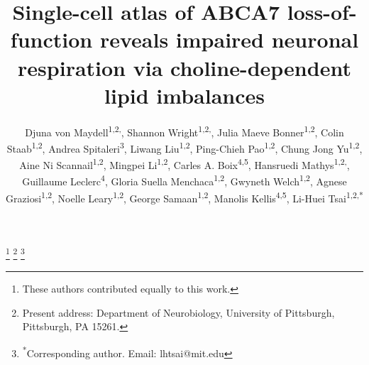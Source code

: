 \title{Single-cell atlas of ABCA7 loss-of-function reveals impaired neuronal respiration via choline-dependent lipid imbalances}

\author{%
  \parbox{\textwidth}{%
    Djuna von Maydell\textsuperscript{1,2,\textdagger}, 
    Shannon Wright\textsuperscript{1,2,\textdagger}, 
    Julia Maeve Bonner\textsuperscript{1,2}, 
    Colin Staab\textsuperscript{1,2}, 
    Andrea Spitaleri\textsuperscript{3}, 
    Liwang Liu\textsuperscript{1,2}, 
    Ping-Chieh Pao\textsuperscript{1,2}, 
    Chung Jong Yu\textsuperscript{1,2}, 
    Aine Ni Scannail\textsuperscript{1,2}, 
    Mingpei Li\textsuperscript{1,2}, 
    Carles A. Boix\textsuperscript{4,5}, 
    Hansruedi Mathys\textsuperscript{1,2,\textdaggerdbl}, 
    Guillaume Leclerc\textsuperscript{4}, 
    Gloria Suella Menchaca\textsuperscript{1,2}, 
    Gwyneth Welch\textsuperscript{1,2}, 
    Agnese Graziosi\textsuperscript{1,2}, 
    Noelle Leary\textsuperscript{1,2}, 
    George Samaan\textsuperscript{1,2}, 
    Manolis Kellis\textsuperscript{4,5}, 
    Li-Huei Tsai\textsuperscript{1,2,*}
  }%
}

\date{}
\maketitle


\thanks{\textsuperscript{\textdagger}These authors contributed equally to this work.}
\thanks{\textsuperscript{\textdaggerdbl}Present address: Department of Neurobiology, University of Pittsburgh, Pittsburgh, PA 15261.}
\thanks{\textsuperscript{*}Corresponding author. Email: lhtsai@mit.edu}


